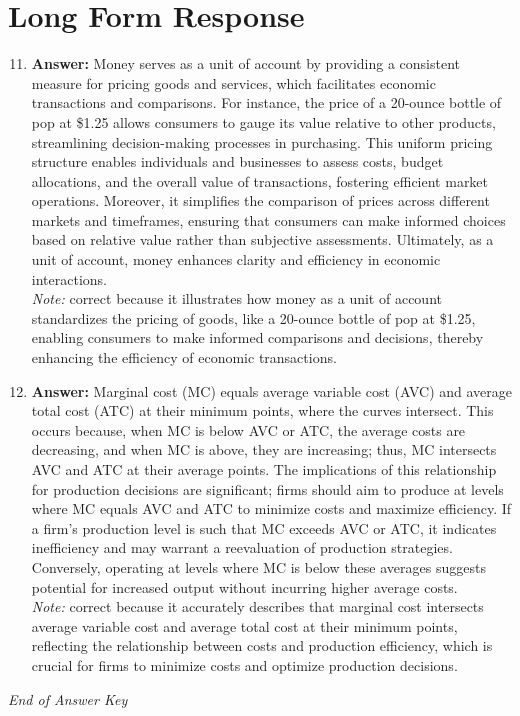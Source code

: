 \documentclass[12pt]{article}
\begin{document}
\section*{Long Form Response}
\begin{enumerate}[label=\arabic*.]
\setcounter{enumi}{10}
\item \textbf{Answer:} Money serves as a unit of account by providing a consistent measure for pricing goods and services, which facilitates economic transactions and comparisons. For instance, the price of a 20-ounce bottle of pop at \$1.25 allows consumers to gauge its value relative to other products, streamlining decision-making processes in purchasing. This uniform pricing structure enables individuals and businesses to assess costs, budget allocations, and the overall value of transactions, fostering efficient market operations. Moreover, it simplifies the comparison of prices across different markets and timeframes, ensuring that consumers can make informed choices based on relative value rather than subjective assessments. Ultimately, as a unit of account, money enhances clarity and efficiency in economic interactions.
\\ \textit{Note:} correct because it illustrates how money as a unit of account standardizes the pricing of goods, like a 20-ounce bottle of pop at \$1.25, enabling consumers to make informed comparisons and decisions, thereby enhancing the efficiency of economic transactions.
\item \textbf{Answer:} Marginal cost (MC) equals average variable cost (AVC) and average total cost (ATC) at their minimum points, where the curves intersect. This occurs because, when MC is below AVC or ATC, the average costs are decreasing, and when MC is above, they are increasing; thus, MC intersects AVC and ATC at their average points. The implications of this relationship for production decisions are significant; firms should aim to produce at levels where MC equals AVC and ATC to minimize costs and maximize efficiency. If a firm's production level is such that MC exceeds AVC or ATC, it indicates inefficiency and may warrant a reevaluation of production strategies. Conversely, operating at levels where MC is below these averages suggests potential for increased output without incurring higher average costs.
\\ \textit{Note:} correct because it accurately describes that marginal cost intersects average variable cost and average total cost at their minimum points, reflecting the relationship between costs and production efficiency, which is crucial for firms to minimize costs and optimize production decisions.
\end{enumerate}

\vfill
\noindent\textit{End of Answer Key}
\end{document}
